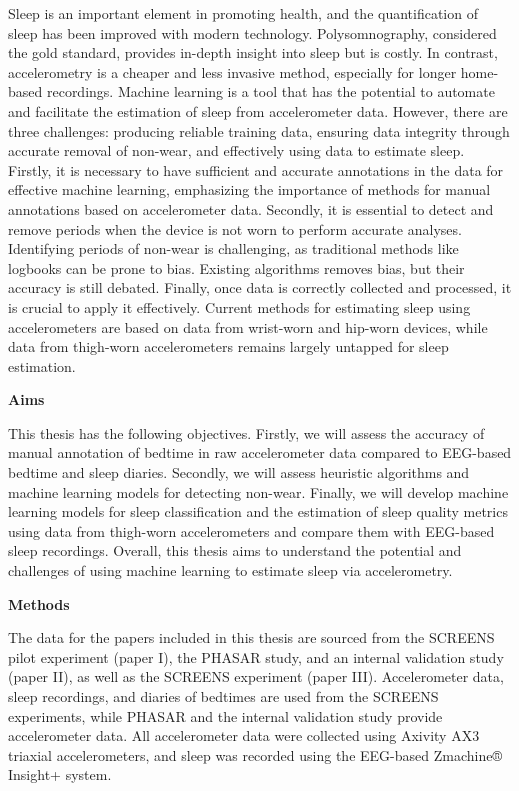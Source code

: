\documentclass[
  10pt,
]{scrbook}
\begin{document}
Sleep is an important element in promoting health, and the
quantification of sleep has been improved with modern technology.
Polysomnography, considered the gold standard, provides in-depth insight
into sleep but is costly. In contrast, accelerometry is a cheaper and
less invasive method, especially for longer home-based recordings.
Machine learning is a tool that has the potential to automate and
facilitate the estimation of sleep from accelerometer data. However,
there are three challenges: producing reliable training data, ensuring
data integrity through accurate removal of non-wear, and effectively
using data to estimate sleep. Firstly, it is necessary to have
sufficient and accurate annotations in the data for effective machine
learning, emphasizing the importance of methods for manual annotations
based on accelerometer data. Secondly, it is essential to detect and
remove periods when the device is not worn to perform accurate analyses.
Identifying periods of non-wear is challenging, as traditional methods
like logbooks can be prone to bias. Existing algorithms removes bias,
but their accuracy is still debated. Finally, once data is correctly
collected and processed, it is crucial to apply it effectively. Current
methods for estimating sleep using accelerometers are based on data from
wrist-worn and hip-worn devices, while data from thigh-worn
accelerometers remains largely untapped for sleep estimation.

\textbf{Aims}

This thesis has the following objectives. Firstly, we will assess the
accuracy of manual annotation of bedtime in raw accelerometer data
compared to EEG-based bedtime and sleep diaries. Secondly, we will
assess heuristic algorithms and machine learning models for detecting
non-wear. Finally, we will develop machine learning models for sleep
classification and the estimation of sleep quality metrics using data
from thigh-worn accelerometers and compare them with EEG-based sleep
recordings. Overall, this thesis aims to understand the potential and
challenges of using machine learning to estimate sleep via
accelerometry.

\textbf{Methods}

The data for the papers included in this thesis are sourced from the
SCREENS pilot experiment (paper I), the PHASAR study, and an internal
validation study (paper II), as well as the SCREENS experiment (paper
III). Accelerometer data, sleep recordings, and diaries of bedtimes are
used from the SCREENS experiments, while PHASAR and the internal
validation study provide accelerometer data. All accelerometer data were
collected using Axivity AX3 triaxial accelerometers, and sleep was
recorded using the EEG-based Zmachine® Insight+ system.
\end{document}
